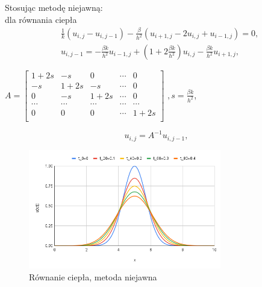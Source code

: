 \documentclass[12pt, a4paper]{article}
\begin{document}
\newpage
Stosując metodę niejawną:\\
dla równania ciepła
\begin{equation}
\begin{split}
& \frac{1}{k}(u_{i,j}-u_{i,j-1})-\frac{\beta}{h^{2}}(u_{i+1,j}-2u_{i,j}+u_{i-1,j})=0,\\
& u_{i,j-1}=-\frac{\beta k}{h^{2}}u_{i-1,j}+(1+2\frac{\beta k}{h^{2}})u_{i,j}-\frac{\beta k}{h^{2}}u_{i+1,j},
\end{split}
\end{equation}
\begin{center}
$A=
\begin{bmatrix}
1+2s & -s & 0 & \cdots & 0\\
-s & 1+2s & -s & \cdots & 0\\
0 & -s & 1+2s & \cdots & 0\\
\cdots & \cdots & \cdots & \cdots & \cdots\\
0 & 0 & 0 & \cdots & 1+2s\\
\end{bmatrix}$
$, s=\frac{\beta k}{h^{2}}$,
\end{center}
\begin{equation}
u_{i,j}=A^{-1}u_{i,j-1},
\end{equation}
\begin{figure}[h]
\caption{Równanie ciepła, metoda niejawna}
\centering
\includegraphics[width=0.75\textwidth]{8}
\end{figure}
\newpage
\end{document}
